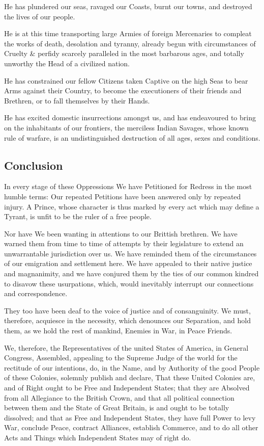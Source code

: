 \documentclass[11pt,a4paper]{article}
\begin{document}
He has plundered our seas, ravaged our Coasts, burnt our towns, and destroyed the lives of our people.

He is at this time transporting large Armies of foreign Mercenaries to compleat the works of death, desolation and tyranny, already begun with circumstances of Cruelty \& perfidy scarcely paralleled in the most barbarous ages, and totally unworthy the Head of a civilized nation.

He has constrained our fellow Citizens taken Captive on the high Seas to bear Arms against their Country, to become the executioners of their friends and Brethren, or to fall themselves by their Hands.

He has excited domestic insurrections amongst us, and has endeavoured to bring on the inhabitants of our frontiers, the merciless Indian Savages, whose known rule of warfare, is an undistinguished destruction of all ages, sexes and conditions.

\subsection*{Conclusion}

In every stage of these Oppressions We have Petitioned for Redress in the most humble terms: Our repeated Petitions have been answered only by repeated injury.
A Prince, whose character is thus marked by every act which may define a Tyrant, is unfit to be the ruler of a free people.

Nor have We been wanting in attentions to our Brittish brethren.
We have warned them from time to time of attempts by their legislature to extend an unwarrantable jurisdiction over us.
We have reminded them of the circumstances of our emigration and settlement here.
We have appealed to their native justice and magnanimity, and we have conjured them by the ties of our common kindred to disavow these usurpations, which, would inevitably interrupt our connections and correspondence.

They too have been deaf to the voice of justice and of consanguinity.
We must, therefore, acquiesce in the necessity, which denounces our Separation, and hold them, as we hold the rest of mankind, Enemies in War, in Peace Friends.

We, therefore, the Representatives of the united States of America, in General Congress, Assembled, appealing to the Supreme Judge of the world for the rectitude of our intentions, do, in the Name, and by Authority of the good People of these Colonies, solemnly publish and declare, That these United Colonies are, and of Right ought to be Free and Independent States; that they are Absolved from all Allegiance to the British Crown, and that all political connection between them and the State of Great Britain, is and ought to be totally dissolved; and that as Free and Independent States, they have full Power to levy War, conclude Peace, contract Alliances, establish Commerce, and to do all other Acts and Things which Independent States may of right do.
\end{document}
